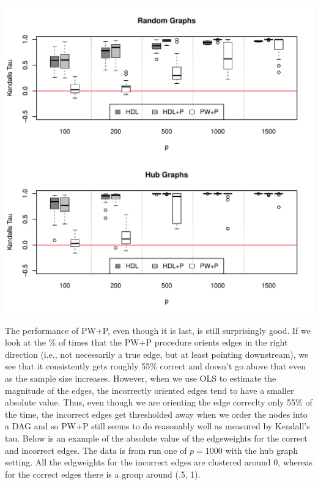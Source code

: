 \documentclass{article}\usepackage[]{graphicx}\usepackage[]{color}
\makeatletter
\def\maxwidth{ %
  \ifdim\Gin@nat@width>\linewidth
    \linewidth
  \else
    \Gin@nat@width
  \fi
}
\newenvironment{knitrout}{}{} %
\makeatother
\begin{document}
\begin{knitrout}
\color{fgcolor}

{\centering \includegraphics[width=\maxwidth]{figure/unnamed-chunk-1-1} 

}



\end{knitrout}



The performance of PW+P, even though it is last, is still surprisingly good. If we look at the \% of times that the PW+P procedure orients edges in the right direction (i.e., not necessarily a true edge, but at least pointing downstream), we see that it consistently gets roughly 55\% correct and doesn't go above that even as the sample size increases. However, when we use OLS to estimate the magnitude of the edges, the incorrectly oriented edges tend to have a smaller absolute value. Thus, even though we are orienting the edge correclty only 55\% of the time, the incorrect edges get thresholded away when we order the nodes into a DAG and so PW+P still seems to do reasonably well as measured by Kendall's tau. Below is an example of the absolute value of the edgeweights for the correct and incorrect edges. The data is from run one of $p = 1000$ with the hub graph setting. All the edgweights for the incorrect edges are clustered around 0, whereas for the correct edges there is a group around (.5, 1). 
\end{document}
